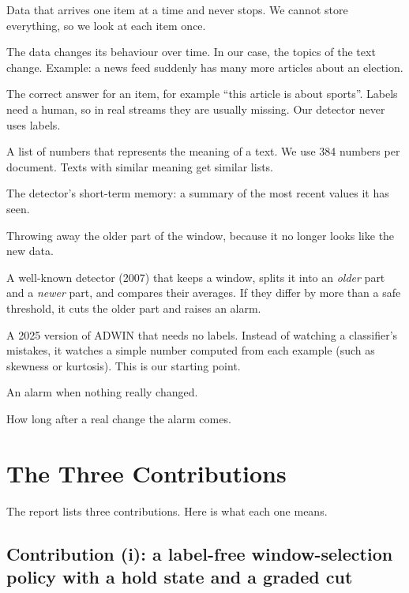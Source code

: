 \documentclass[11pt,a4paper]{article}
\begin{document}
\begin{description}[leftmargin=0pt]
\item[Data stream.] Data that arrives one item at a time and never stops. We cannot store everything, so we look at each item once.
\item[Concept drift.] The data changes its behaviour over time. In our case, the topics of the text change. Example: a news feed suddenly has many more articles about an election.
\item[Label.] The correct answer for an item, for example ``this article is about sports''. Labels need a human, so in real streams they are usually missing. Our detector never uses labels.
\item[Embedding.] A list of numbers that represents the meaning of a text. We use 384 numbers per document. Texts with similar meaning get similar lists.
\item[Window.] The detector's short-term memory: a summary of the most recent values it has seen.
\item[Cut.] Throwing away the older part of the window, because it no longer looks like the new data.
\item[ADWIN.] A well-known detector (2007) that keeps a window, splits it into an \emph{older} part and a \emph{newer} part, and compares their averages. If they differ by more than a safe threshold, it cuts the older part and raises an alarm.
\item[ADWIN-U.] A 2025 version of ADWIN that needs no labels. Instead of watching a classifier's mistakes, it watches a simple number computed from each example (such as skewness or kurtosis). This is our starting point.
\item[False alarm.] An alarm when nothing really changed.
\item[Detection delay.] How long after a real change the alarm comes.
\end{description}

\section{The Three Contributions}
\label{sec:contrib}

The report lists three contributions. Here is what each one means.

\subsection*{Contribution (i): a label-free window-selection policy with a hold state and a graded cut}
\end{document}
